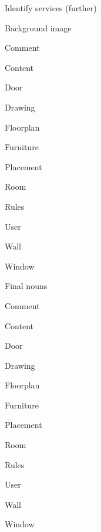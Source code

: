 \begin{paracol}{4}
			
			\switchcolumn
			Identify services (further)\\
			\begin{compactitem}
				\item Background image
				\item Comment
				\item Content
				\item Door
				\item Drawing
				\item Floorplan
				\item Furniture
				\item Placement
				\item Room
				\item Rules
				\item User
				\item Wall
				\item Window
			\end{compactitem}
			
			
			\switchcolumn
			Final nouns\\
			\begin{compactitem}
				\item Comment
				\item Content
				\item Door
				\item Drawing
				\item Floorplan
				\item Furniture
				\item Placement
				\item Room
				\item Rules
				\item User
				\item Wall
				\item Window
			\end{compactitem}
			
			\bigskip
			
		\end{paracol}
	
\clearpage